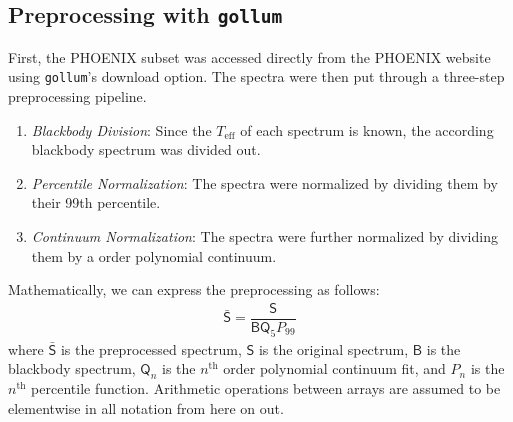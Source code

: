 \documentclass[twocolumn]{aastex631}
\begin{document}
\subsection{Preprocessing with \texttt{gollum}}
First, the PHOENIX subset was accessed directly from the PHOENIX website
using \texttt{gollum}'s download option. The spectra were then put through a 
three-step preprocessing pipeline.
\begin{enumerate}
    \item \textit{Blackbody Division}: Since the $T_{\mathrm{eff}}$ of each spectrum 
    is known, the according blackbody spectrum was divided out.
    \item \textit{Percentile Normalization}: The spectra were normalized by dividing
    them by their 99th percentile.
    \item \textit{Continuum Normalization}: The spectra were further normalized by 
    dividing them by a  order polynomial continuum.
\end{enumerate}
Mathematically, we can express the preprocessing as follows:
\begin{gather}
    \mathsf{\bar{S}} = \dfrac{\mathsf{S}}{\mathsf{B}\mathsf{Q}_5P_{99}}
\end{gather}
where $\mathsf{\bar{S}}$ is the preprocessed spectrum, $\mathsf{S}$ is the 
original spectrum,  $\mathsf{B}$ is the blackbody spectrum, $\mathsf{Q}_n$ 
is the $n^\mathrm{th}$ order polynomial continuum fit, and $P_n$ is the 
$n^\mathrm{th}$ percentile function. Arithmetic operations between arrays 
are assumed to be elementwise in all notation from here on out.
\end{document}
